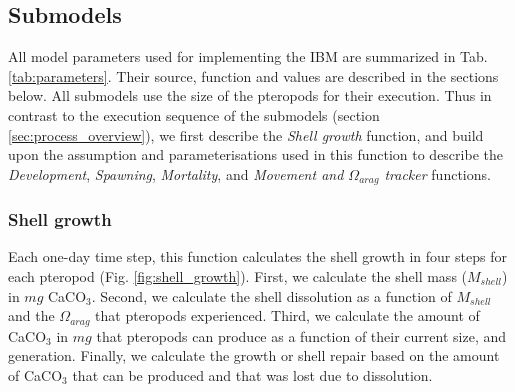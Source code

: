 





\subsection{Submodels}\label{sec:submodels}
All model parameters used for implementing the IBM are summarized in Tab. \ref{tab:parameters}. Their source, function and values are described in the sections below. All submodels use the size of the pteropods for their execution. Thus in contrast to the execution sequence of the submodels (section \ref{sec:process_overview}), we first describe the \textit{Shell growth} function, and build upon the assumption and parameterisations used in this function to describe the \textit{Development}, \textit{Spawning}, \textit{Mortality}, and \textit{Movement and $\Omega_{arag}$ tracker} functions.

\subsubsection{Shell growth}
Each one-day time step, this function calculates the shell growth in four steps for each pteropod (Fig. \ref{fig:shell_growth}). First, we calculate the shell mass ($M_{shell}$) in $mg$ CaCO$_3$. Second, we calculate the shell dissolution as a function of $M_{shell}$ and the $\Omega_{arag}$ that pteropods experienced. Third, we calculate the amount of CaCO$_3$ in $mg$ that pteropods can produce as a function of their current size, and generation. Finally, we calculate the growth or shell repair based on the amount of CaCO$_3$ that can be produced and that was lost due to dissolution.

